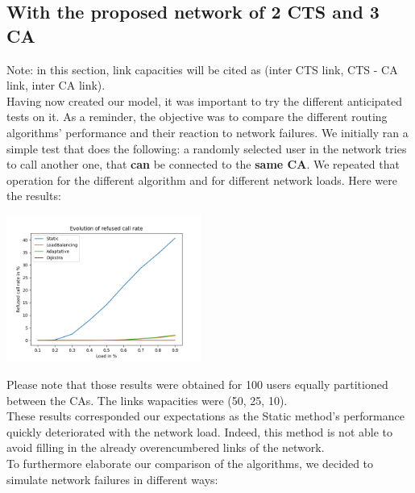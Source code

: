 \documentclass[lettersize,journal]{IEEEtran} %
\begin{document}
\subsection{With the proposed network of 2 CTS and 3 CA}
Note: in this section, link capacities will be cited as (inter CTS link, CTS - CA link, inter CA link).\\
Having now created our model, it was important to try the different anticipated tests on it. As a reminder, the objective was to
compare the different routing algorithms' performance and their reaction to network failures.
We initially ran a simple test that does the following: a randomly selected user in the network tries to call another one, that
\textbf{can} be connected to the \textbf{same CA}. We repeated that operation for the different algorithm and for different
network loads. Here were the results:
\begin{center}
\includegraphics[width=0.48\textwidth]{images/call_rate.png}
\end{center}
Please note that those results were obtained for 100 users equally partitioned between the CAs. The
links wapacities were (50, 25, 10).\\
These results corresponded our expectations as the Static method's performance quickly deteriorated with the network load. Indeed, 
this method is not able to avoid filling in the already overencumbered links of the network.\\
To furthermore elaborate our comparison of the algorithms, we decided to simulate network failures in different ways:
\end{document}
